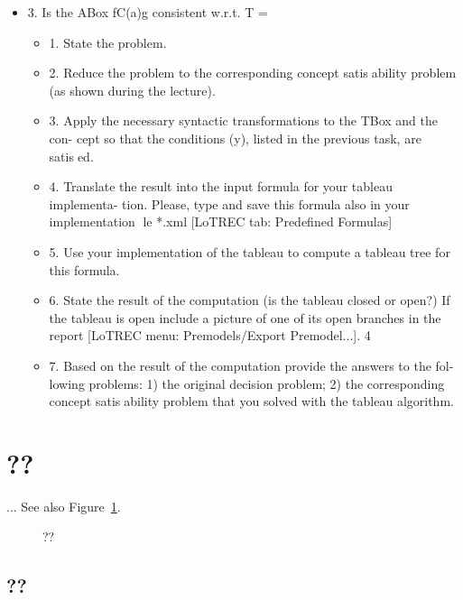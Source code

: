 \documentclass[11pt]{article} %
\begin{document}
\begin{itemize}
\begin{itemize}
\end{itemize}
\item 3. Is the ABox fC(a)g consistent w.r.t. T =
\begin{itemize}

\item 1. State the problem.
\item 2. Reduce the problem to the corresponding concept satisability problem
(as shown during the lecture).
\item 3. Apply the necessary syntactic transformations to the TBox and the con-
cept so that the conditions (y), listed in the previous task, are satised.
\item 4. Translate the result into the input formula for your tableau implementa-
tion. Please, type and save this formula also in your implementation le
*.xml [LoTREC tab: Predefined Formulas]
\item 5. Use your implementation of the tableau to compute a tableau tree for this
formula.
\item 6. State the result of the computation (is the tableau closed or open?) If the
tableau is open include a picture of one of its open branches in the report
[LoTREC menu: Premodels/Export Premodel...].
4
\item 7. Based on the result of the computation provide the answers to the fol-
lowing problems: 1) the original decision problem; 2) the corresponding
concept satisability problem that you solved with the tableau algorithm.

\end{itemize}

\end{itemize}



\section{??}
\label{sec:??}

... See also Figure~\ref{fig:??}. 

\begin{figure}[htbp]
\begin{center}
\comment{\texttt{[image: ??]}}
\caption{??}
\label{fig:??}
\end{center}
\end{figure}

\subsection{??}
\label{sec:??}
\end{document}
